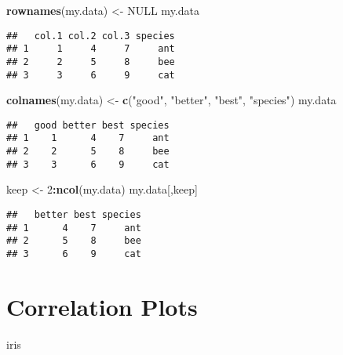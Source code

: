 \documentclass[]{book}
\newenvironment{Shaded}{\begin{snugshade}}{\end{snugshade}}
\newcommand{\DecValTok}[1]{\textcolor[rgb]{0.00,0.00,0.81}{#1}}
\newcommand{\KeywordTok}[1]{\textcolor[rgb]{0.13,0.29,0.53}{\textbf{#1}}}
\newcommand{\NormalTok}[1]{#1}
\newcommand{\OperatorTok}[1]{\textcolor[rgb]{0.81,0.36,0.00}{\textbf{#1}}}
\newcommand{\OtherTok}[1]{\textcolor[rgb]{0.56,0.35,0.01}{#1}}
\newcommand{\StringTok}[1]{\textcolor[rgb]{0.31,0.60,0.02}{#1}}
\begin{document}
\begin{Shaded}
\begin{Highlighting}[]
\KeywordTok{rownames}\NormalTok{(my.data) <-}\StringTok{ }\OtherTok{NULL}
\NormalTok{my.data}
\end{Highlighting}
\end{Shaded}

\begin{verbatim}
##   col.1 col.2 col.3 species
## 1     1     4     7     ant
## 2     2     5     8     bee
## 3     3     6     9     cat
\end{verbatim}

\begin{Shaded}
\begin{Highlighting}[]
\KeywordTok{colnames}\NormalTok{(my.data) <-}\StringTok{ }\KeywordTok{c}\NormalTok{(}\StringTok{"good"}\NormalTok{, }\StringTok{"better"}\NormalTok{, }\StringTok{"best"}\NormalTok{, }\StringTok{"species"}\NormalTok{)}
\NormalTok{my.data}
\end{Highlighting}
\end{Shaded}

\begin{verbatim}
##   good better best species
## 1    1      4    7     ant
## 2    2      5    8     bee
## 3    3      6    9     cat
\end{verbatim}

\begin{Shaded}
\begin{Highlighting}[]
\NormalTok{keep <-}\StringTok{ }\DecValTok{2}\OperatorTok{:}\KeywordTok{ncol}\NormalTok{(my.data)}
\NormalTok{my.data[,keep]}
\end{Highlighting}
\end{Shaded}

\begin{verbatim}
##   better best species
## 1      4    7     ant
## 2      5    8     bee
## 3      6    9     cat
\end{verbatim}

\hypertarget{correlation-plots}{%
\chapter{Correlation Plots}\label{correlation-plots}}

\begin{Shaded}
\begin{Highlighting}[]
\NormalTok{iris}
\end{Highlighting}
\end{Shaded}
\end{document}
